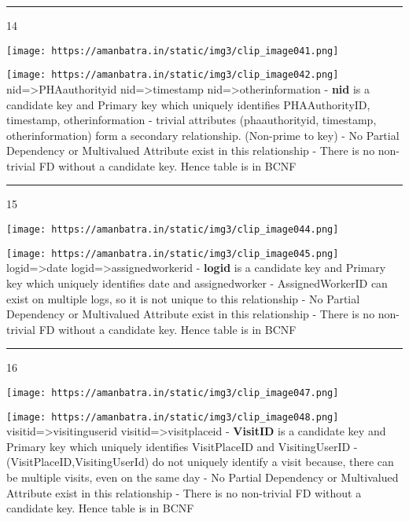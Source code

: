 \documentclass[
]{article}
\begin{document}
\begin{center}\rule{0.5\linewidth}{0.5pt}\end{center}

14

\texttt{[image: https://amanbatra.in/static/img3/clip\_image041.png]}

\texttt{[image: https://amanbatra.in/static/img3/clip\_image042.png]}
nid=\textgreater PHAauthorityid nid=\textgreater timestamp
nid=\textgreater otherinformation - \textbf{nid} is a candidate key and
Primary key which uniquely identifies PHAAuthorityID, timestamp,
otherinformation - trivial attributes (phaauthorityid, timestamp,
otherinformation) form a secondary relationship. (Non-prime to key) - No
Partial Dependency or Multivalued Attribute exist in this relationship -
There is no non-trivial FD without a candidate key. Hence table is in
BCNF

\begin{center}\rule{0.5\linewidth}{0.5pt}\end{center}

15

\texttt{[image: https://amanbatra.in/static/img3/clip\_image044.png]}

\texttt{[image: https://amanbatra.in/static/img3/clip\_image045.png]}
logid=\textgreater date logid=\textgreater assignedworkerid -
\textbf{logid} is a candidate key and Primary key which uniquely
identifies date and assignedworker - AssignedWorkerID can exist on
multiple logs, so it is not unique to this relationship - No Partial
Dependency or Multivalued Attribute exist in this relationship - There
is no non-trivial FD without a candidate key. Hence table is in BCNF

\begin{center}\rule{0.5\linewidth}{0.5pt}\end{center}

16

\texttt{[image: https://amanbatra.in/static/img3/clip\_image047.png]}

\texttt{[image: https://amanbatra.in/static/img3/clip\_image048.png]}
visitid=\textgreater visitinguserid visitid=\textgreater visitplaceid -
\textbf{VisitID} is a candidate key and Primary key which uniquely
identifies VisitPlaceID and VisitingUserID -
(VisitPlaceID,VisitingUserId) do not uniquely identify a visit because,
there can be multiple visits, even on the same day - No Partial
Dependency or Multivalued Attribute exist in this relationship - There
is no non-trivial FD without a candidate key. Hence table is in BCNF
\textbf{\emph{ }}
\end{document}
